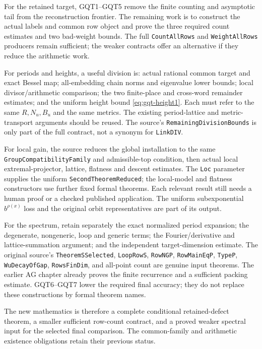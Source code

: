 \documentclass[11pt,a4paper]{article}
\numberwithin{equation}{section}
\theoremstyle{remark}\newtheorem{remark}[theorem]{Remark}
\begin{document}
For the retained target, GQT1--GQT5 remove the finite counting
and asymptotic tail from the reconstruction frontier. The
remaining work is to construct the actual labels and common
row object and prove the three required count estimates and two
bad-weight bounds. The full \texttt{Count\allowbreak All\allowbreak Rows} and
\texttt{Weight\allowbreak All\allowbreak Rows} producers remain sufficient; the weaker
contracts offer an alternative if they reduce the arithmetic work.

For periods and heights, a useful division is: actual rational
common target and exact Bessel map; all-embedding chain norms and
eigenvalue lower bounds; local divisor/arithmetic comparison;
the two finite-place and cross-word remainder estimates; and
the uniform height bound \eqref{eq:gqt-height1}. Each must refer
to the same $R,\allowbreak{} N_u,\allowbreak{} B_u$ and the same metrics. The existing
period-lattice and metric-transport arguments should be reused.
The source's \texttt{Remaining\allowbreak Division\allowbreak Bounds} is only part of
the full contract, not a synonym for \texttt{Link\allowbreak DIV}.

For local gain, the source reduces the global installation to
the same \texttt{GroupCompatibility\allowbreak{}Family} and admissible-top
condition, then actual local extremal-projector, lattice, flatness
and descent estimates. The \texttt{Loc} parameter supplies the
uniform \texttt{Second\allowbreak Theorem\allowbreak Reduced}; the local-model and
flatness constructors use further fixed formal theorems. Each
relevant result still needs a human proof or a checked published
application. The uniform subexponential
$b^{\rho(x)}$ loss and the original orbit representatives are
part of its output.

For the spectrum, retain separately the exact normalized period
expansion; the degenerate, nongeneric, loop and generic terms;
the Fourier/derivative and lattice-summation argument; and the
independent target-dimension estimate. The original source's
\texttt{Theorem\allowbreak SSelected}, \texttt{Loop\allowbreak Row\allowbreak S},
\texttt{Row\allowbreak NGP}, \texttt{Row\allowbreak Main\allowbreak Eq\allowbreak P}, \texttt{Type\allowbreak P},
\texttt{Wu\allowbreak Decay\allowbreak Of\allowbreak Gap}, \texttt{Rows\allowbreak Fin\allowbreak Dim}, and all-point count
are genuine input theorems. The earlier AG chapter already
proves the finite recurrence and a sufficient packing estimate.
GQT6--GQT7 lower the required final accuracy; they do not replace
these constructions by formal theorem names.

The new mathematics is therefore a complete conditional
retained-defect theorem, a smaller sufficient row-count contract,
and a proved weaker spectral input for the selected final
comparison. The common-family and arithmetic existence
obligations retain their previous status.

\endgroup
\end{document}
